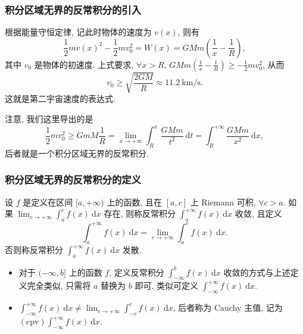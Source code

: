 
\begin{frame}
\frametitle{积分区域无界的反常积分的引入}

\begin{eg}[由万有引力定律导出第二宇宙速度]
根据能量守恒定律, 记此时物体的速度为 $v(x)$, 则有
\[
\frac{1}{2} m v(x)^2 - \frac{1}{2} m v_0^2 = W(x) = GMm \left(\frac{1}{x} - \frac{1}{R}\right),
\]
其中 $v_0$ 是物体的初速度. 上式要求, $\forall x > R$, $GMm \left(\frac{1}{x} - \frac{1}{R}\right) \geqslant -\frac{1}{2} m v_0^2$, 从而
\[
v_0 \geqslant \sqrt{\frac{2GM}{R}} \approx 11.2 ~ \mathrm{km/s}.
\]
这就是第二宇宙速度的表达式.

\pause
\vspace{0.5em}

注意, 我们这里导出的是
\[
\frac{1}{2} m v_0^2 \geqslant GmM \frac{1}{R} = \lim_{x \to +\infty} \int_R^x \frac{GMm}{t^2} ~ \mathrm{d} t = \int_R^{+\infty} \frac{GMm}{x^2} ~ \mathrm{d} x,
\]
后者就是一个积分区域无界的反常积分.
\end{eg}

\end{frame}


\begin{frame}
\frametitle{积分区域无界的反常积分的定义}

\begin{Def}[积分区域无界的反常积分]
设 $f$ 是定义在区间 $[a, +\infty)$ 上的函数, 且在 $[a, c]$ 上 Riemann 可积, $\forall c > a$. 如果 $\lim_{c \to +\infty} \int_a^c f(x) ~ \mathrm{d} x$ 存在, 则称反常积分 $\int_a^{+\infty} f(x) ~ \mathrm{d} x$ 收敛, 且定义
\[
\int_a^{+\infty} f(x) ~ \mathrm{d} x = \lim_{c \to +\infty} \int_a^c f(x) ~ \mathrm{d} x.
\]
否则称反常积分 $\int_a^{+\infty} f(x) ~ \mathrm{d} x$ 发散.
\end{Def}

\pause

\begin{remark}
\begin{itemize}
\item 对于 $(-\infty, b]$ 上的函数 $f$, 定义反常积分 $\int_{-\infty}^b f(x) ~ \mathrm{d} x$ 收敛的方式与上述定义完全类似, 只需将 $a$ 替换为 $b$ 即可. 类似可定义 $\int_{-\infty}^{+\infty} f(x) ~ \mathrm{d} x$.
\item $\int_{-\infty}^{+\infty} f(x) ~ \mathrm{d} x \neq \lim_{c \to +\infty} \int_{-c}^c f(x) ~ \mathrm{d} x$, 后者称为 Cauchy 主值, 记为 $\mathrm{(cpv)} \int_{-\infty}^{+\infty} f(x) ~ \mathrm{d} x$.
\end{itemize}
\end{remark}

\end{frame}

